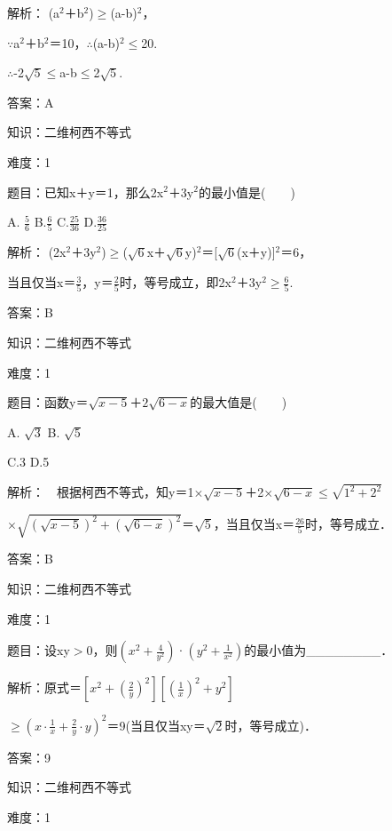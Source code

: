 \documentclass{article} %
\begin{document}
 解析： (a${}^{2}$＋b${}^{2}$)$\mathrm{\ge}$(a-b)${}^{2}$，

$\mathrm{\because}$a${}^{2}$＋b${}^{2}$＝10，$\mathrm{\therefore}$(a-b)${}^{2}$$\mathrm{\le}$20.

$\mathrm{\therefore}$-2$\sqrt{5}$$\mathrm{\le}$a-b$\mathrm{\le}$2$\sqrt{5}$.

 答案：A

 

 知识：二维柯西不等式

 难度：1

 题目：已知x＋y＝1，那么2x${}^{2}$＋3y${}^{2}$的最小值是(　　)

A.  $\frac{5}{6}$  B.$\frac{6}{5}$    C.$\frac{25}{36}$    D.$\frac{36}{25}$

 解析： (2x${}^{2}$＋3y${}^{2}$)$\mathrm{\ge}$($\sqrt{6}$x＋$\sqrt{6}$y)${}^{2}$＝[$\sqrt{6}$(x＋y)]${}^{2}$＝6，

当且仅当x＝$\frac{3}{5}$，y＝$\frac{2}{5}$时，等号成立，即2x${}^{2}$＋3y${}^{2}$$\mathrm{\ge\frac{6}{5}}$.

 答案：B

 

 知识：二维柯西不等式

 难度：1

 题目：函数y＝$\sqrt{x-5}$＋$2\sqrt{6-x}$的最大值是(　　)

A. $\sqrt{3}$  B.  $\sqrt{5}$

C.3               D.5

 解析：　根据柯西不等式，知y＝1$\mathrm{\times}$$\sqrt{x-5}$＋2$\mathrm{\times}$$\sqrt{6-x}$$\mathrm{\le}$$\sqrt{1^2+2^2}$

 $\mathrm{\times}$$\sqrt{(\sqrt{x-5})^2+(\sqrt{6-x})^2}$＝$\sqrt{5}$，当且仅当x＝$\frac{26}{5}$时，等号成立．

 答案：B

 

 知识：二维柯西不等式

 难度：1

 题目：设xy$\mathrm{>}$0，则$(x^2+\frac{4}{y^2})$·$(y^2+\frac{1}{x^2})$的最小值为\_\_\_\_\_\_\_\_．

 解析：原式＝$[x^2+(\frac{2}{y})^2][(\frac{1}{x})^2+y^2]$

$\mathrm{\ge}$$(x\cdot\frac{1}{x}+\frac{2}{y}\cdot y)^2$＝9(当且仅当xy＝$\sqrt{2}$时，等号成立)．

 答案：9

 

 知识：二维柯西不等式

 难度：1
\end{document}
